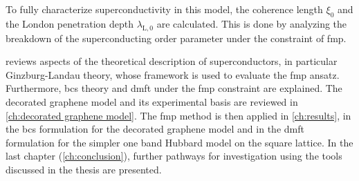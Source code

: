 \documentclass[../main.tex]{subfiles}
\begin{document}
To fully characterize superconductivity in this model, the coherence length \(\xi_0\) and the London penetration depth \(\lambda_{\mathrm{L}, 0}\) are calculated.
This is done by analyzing the breakdown of the superconducting order parameter under the constraint of \gls{fmp}.

 reviews aspects of the theoretical description of superconductors, in particular Ginzburg-Landau theory, whose framework is used to evaluate the \gls{fmp} ansatz.
Furthermore, \gls{bcs} theory and \gls{dmft} under the \gls{fmp} constraint are explained.
The decorated graphene model and its experimental basis are reviewed in \cref{ch:decorated graphene model}.
The \gls{fmp} method is then applied in \cref{ch:results}, in the \gls{bcs} formulation for the decorated graphene model and in the \gls{dmft} formulation for the simpler one band Hubbard model on the square lattice.
In the last chapter (\cref{ch:conclusion}), further pathways for investigation using the tools discussed in the thesis are presented.
\end{document}

